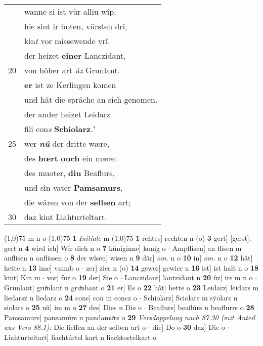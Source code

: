 \documentclass[8pt,a4paper,notitlepage]{article}
\begin{document}
\begin{table}[ht]
\begin{minipage}[t]{0.5\linewidth}
\begin{tabular}{rl}
 & wanne si ist vür alliu wîp.\\ 
 & hie sint ir boten, vürsten drî,\\ 
 & kin\textit{t} vor missewende vrî.\\ 
 & der heizet \textbf{einer} Lanczidant,\\ 
20 & von hôher art \textit{ûz} Grunlant.\\ 
 & \textbf{er} ist ze Kerlingen komen\\ 
 & und hât die sprâche an sich genomen.\\ 
 & der ander heizet Leidarz\\ 
 & fili con\textit{s} \textbf{Schiolarz}."\\ 
25 & wer \textit{\textbf{nû}} der dritte wære,\\ 
 & des \textbf{hœrt} \textbf{ouch} ein mære:\\ 
 & des muoter, \textbf{diu} Beaflurs,\\ 
 & und sîn vater \textbf{Pamsamurs},\\ 
 & die wâren von der \textbf{selben} art;\\ 
30 & daz kint Liahturteltart.\\ 
\end{tabular}
\scriptsize
\line(1,0){75} \newline
m n o \newline
\line(1,0){75} \newline
\textbf{1} \textit{Initiale} m  \newline
\line(1,0){75} \newline
\textbf{1} rehtes] rechten n (o) \textbf{3} gert] [gerst]: gert n \textbf{4} wird ich] Wir dich n o \textbf{7} küniginne] konig o  $\cdot$ Ampflisen] an flisen m anflisen n anflissen o \textbf{8} der wîsen] wisen n \textbf{9} dâr] \textit{om.} n o \textbf{10} in] \textit{om.} n o \textbf{12} hât] hette n \textbf{13} ime] vmmb o  $\cdot$ zer] zier n (o) \textbf{14} gewer] gewier n \textbf{16} ist] ist halt n o \textbf{18} kint] Kin m  $\cdot$ vor] fur o \textbf{19} der] Sie o  $\cdot$ Lanczidant] lantzidant n \textbf{20} ûz] irs m n o  $\cdot$ Grunlant] gruͯnlant n gruͯnbant o \textbf{21} er] Es o \textbf{22} hât] hette o \textbf{23} Leidarz] leidars m liedarsz n liedarz o \textbf{24} cons] con m concz o  $\cdot$ Schiolarz] Sciolars m sẏolars n siolars o \textbf{25} nû] im m o \textbf{27} des] Dies n Die o  $\cdot$ Beaflurs] beaflúrs n beaflurrs o \textbf{28} Pamsamurs] pansamúrs n pandamuͯrs o \textbf{29} \textit{Versdoppelung nach 87.30 (mit Anteil aus Vers 88.1):} Die lieffen an der selben art o   $\cdot$ die] Do o \textbf{30} daz] Die o  $\cdot$ Liahturteltart] liachtúrtel kart n liachtortelkart o \newline
\end{minipage}
\end{table}
\end{document}
